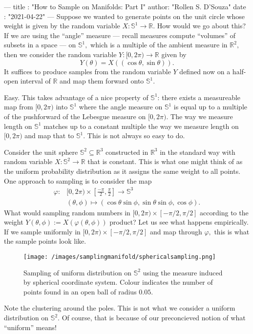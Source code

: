 ---
title :   "How to Sample on Manifolds: Part I"
author:   "Rollen S. D'Souza"
date  :   "2021-04-22"
---
Suppose we wanted to generate points on the unit circle whose weight is given by the random variable \(X: \mathbb{S}^1 \to \mathbb{R}.\)
How would we go about this?
If we are using the ``angle'' measure --- recall measures compute ``volumes'' of subsets in a space --- on \(\mathbb{S}^1,\) which is a multiple of the ambient measure in \(\mathbb{R}^2,\) then we consider the random variable \(Y: [0, 2\pi) \to \mathbb{R}\) given by
\[
  Y(\theta) = X\left( (\cos \theta, \sin \theta) \right).
\]
It suffices to produce samples from the random variable \(Y\) defined now on a half-open interval of \(\mathbb{R}\) and map them forward onto \(\mathbb{S}^1.\)

Easy.
This takes advantage of a nice property of \(\mathbb{S}^1\):
there exists a measureable map from \([0, 2\pi)\) into \(\mathbb{S}^1\) where the angle measure on \(\mathbb{S}^1\) is equal up to a multiple of the pushforward of the Lebesgue measure on \([0, 2\pi).\)
The way we measure length on \(\mathbb{S}^1\) matches up to a constant multiple the way we measure length on \([0, 2\pi)\) and map that to \(\mathbb{S}^1.\)
This is not always so easy to do.

Consider the unit sphere \(\mathbb{S}^2 \subseteq \mathbb{R}^3\) constructed in \(\mathbb{R}^3\) in the standard way with random variable \(X: \mathbb{S}^2 \to \mathbb{R}\) that is constant.
This is what one might think of as the uniform probability distribution as it assigns the same weight to all points.
One approach to sampling is to consider the map
\[
\begin{aligned}
  \varphi: &[0, 2\pi) \times \left[\frac{-\pi}{2}, \frac{\pi}{2}\right] \to \mathbb{S}^3\\
    &(\theta, \phi) \mapsto \left(\cos\theta \sin\phi, \sin\theta \sin\phi, \cos\phi\right).
\end{aligned}
\]
What would sampling random numbers in \([0, 2\pi) \times [-\pi/2, \pi/2]\) according to the weight \(Y(\theta, \phi) := X(\varphi(\theta,\phi))\) product?
Let us see what happens empirically.
If we sample uniformly in \([0, 2\pi) \times [-\pi/2, \pi/2]\) and map through \(\varphi,\) this is what the sample points look like.
%
\begin{figure}
  \texttt{[image: /images/samplingmanifold/sphericalsampling.png]}
  \caption{Sampling of uniform distribution on \(\mathbb{S}^2\) using the measure induced by spherical coordinate system. Colour indicates the number of points found in an open ball of radius \(0.05.\)}
\end{figure}
%
Note the clustering around the poles.
This is not what we consider a uniform distribution on \(\mathbb{S}^2.\)
Of course, that is because of our preconcieved notion of what ``uniform'' means!

